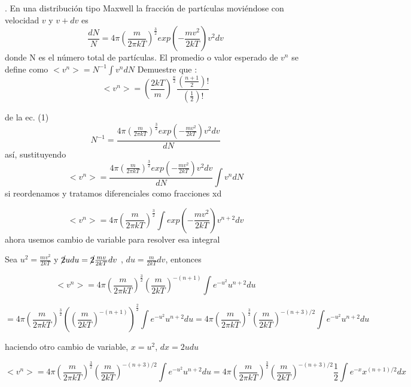 \documentclass[12pt,a4paper]{article}
\begin{document}
. En una distribución tipo Maxwell la fracción de partículas moviéndose con velocidad $v$ y $v+dv$ es
\begin{equation}
    \frac{dN}{N} = 4 \pi ( \frac{m}{2\pi kT})^ \frac{3}{2}  exp(-\frac{m v^2}{2kT}) v^2 dv
\end{equation}
donde N es el número total de partículas.
El promedio o valor esperado de $v^n$ se define como $< v^n > = N ^{-1} \int v^n dN$
Demuestre  que :
\begin{equation*}
    < v^n > = ( \frac{2kT}{m} )^{\frac{n}{2}} \frac{(\frac{n+1}{2})!}{(\frac{1}{2})!}
\end{equation*}

de la ec. (1)
\begin{equation*}
    N^{-1} = \frac{4 \pi ( \frac{m}{2\pi kT})^ \frac{3}{2}  exp(-\frac{m v^2}{2kT}) v^2 dv}{dN}
\end{equation*}
así, sustituyendo 
\begin{equation*}
    < v^n > = \frac{4 \pi ( \frac{m}{2\pi kT})^ \frac{3}{2}  exp(-\frac{m v^2}{2kT}) v^2 dv}{dN} \int v^n dN
\end{equation*}
si reordenamos y tratamos diferenciales como fracciones xd

\begin{equation*}
    < v^n > = 4 \pi ( \frac{m}{2\pi kT})^ \frac{3}{2}  \int exp(-\frac{m v^2}{2kT}) v^{n + 2} dv 
\end{equation*}
ahora usemos cambio de variable para resolver esa integral

Sea $u^2 = \frac{m v^2}{2kT}$ y $\cancel{2}udu = \cancel{2}\frac{mv}{2kT} dv$ , $du = \frac{m}{2kT} dv$, entonces

\begin{equation*}
     <v^n > = 4 \pi (\frac{m}{2 \pi k T})^{\frac{3}{2}} (\frac{m}{2kT}) ^{-(n+1)}\int  e^{-u^2} u^{n+2} du
\end{equation*}

\begin{equation*}
    = 4 \pi (\frac{m}{2 \pi k T})^{\frac{3}{2}} ((\frac{m}{2kT}) ^{-(n+1)})^{\frac{2}{2}}\int  e^{-u^2} u^{n+2} du = 4 \pi (\frac{m}{2 \pi k T})^{\frac{3}{2}} (\frac{m}{2kT}) ^{-(n+3)/2}\int  e^{-u^2} u^{n+2} du 
\end{equation*}

haciendo otro cambio de variable, $x = u^2$, $dx = 2 u du$ 

\begin{equation*}
    < v^n > = 4 \pi (\frac{m}{2 \pi k T})^{\frac{3}{2}} (\frac{m}{2kT}) ^{-(n+3)/2}\int  e^{-u^2} u^{n+2} du = 4 \pi (\frac{m}{2 \pi k T})^{\frac{3}{2}} (\frac{m}{2kT}) ^{-(n+3)/2} \frac{1}{2} \int e^{-x} x^{(n+1)/2} dx 
\end{equation*}
\end{document}
